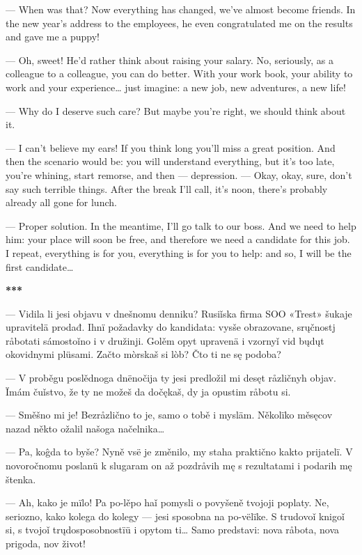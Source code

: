 — When was that? Now everything has changed, we’ve almost become friends. In the new year’s address to the employees, he even congratulated me on the results and gave me a puppy!

— Oh, sweet! He’d rather think about raising your salary. No, seriously, as a colleague to a colleague, you can do better. With your work book, your ability to work and your experience… just imagine: a new job, new adventures, a new life!

— Why do I deserve such care? But maybe you’re right, we should think about it.

— I can’t believe my ears! If you think long you’ll miss a great position. And then the scenario would be: you will understand everything, but it’s too late, you’re whining, start remorse, and then — depression.
— Okay, okay, sure, don’t say such terrible things. After the break I’ll call, it’s noon, there’s probably already all gone for lunch.

— Proper solution. In the meantime, I’ll go talk to our boss. And we need to help him: your place will soon be free, and therefore we need a candidate for this job. I repeat, everything is for you, everything is for you to help: and so, I will be the first candidate…

\begin{center}
	\textbf{***}
\end{center}

— Vidila li jesi objavu v dnešnomu denniku? Rusiǐska firma SOO «Trest» šukaje upravitelä prodađ. Ihnï požadavky do kandidata: vysše obrazovane, srųčnostj råbotati sámostoǐno i v družinji. Golěm opyt upravenä i vzornyǐ vid bųdųt okovidnymi plüsami. Začto mòrskaš si lòb? Čto ti ne sę podoba?

— V proběgu poslědnoga dnënočija ty jesi predložil mi desęt råzličnyh objav. Ïmám čuǐstvo, že ty ne možeš da dočękaš, dy ja opustim råbotu si.

— Směšno mi je! Bezråzlično to je, samo o tobě i mysläm. Několïko měsęcov nazad někto ožalil našoga načelnika…

— Pa, koĝda to byše? Nyně vsë je změnilo, my staha praktično kakto prijatelï. V novoročnomu poslanü k slugaram on až pozdråvih mę s rezultatami i podarih mę štenka.

— Ah, kako je mïlo! Pa po-lěpo haǐ pomysli o povyšeně tvojoji poplaty. Ne, seriozno, kako kolega do kolegy — jesi sposobna na po-vëlïke. S trudovoǐ knigoǐ si, s tvojoǐ trųdosposobnostïü i opytom ti… Samo predstavi: nova råbota, nova prigoda, nov život!

